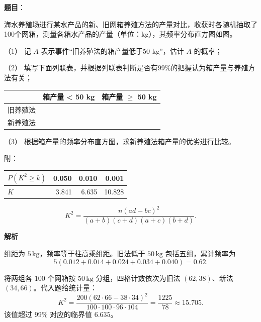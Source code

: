 \begin{answer}

\textbf{题目}：

海水养殖场进行某水产品的新、旧网箱养殖方法的产量对比，收获时各随机抽取了100个网箱，测量各箱水产品的产量（单位：kg），其频率分布直方图如图。
\nopagebreak[4]
\begin{center}\end{center}
\nopagebreak[4]
（1） 记 \(A\) 表示事件“旧养殖法的箱产量低于50 kg”，估计 \(A\) 的概率；

（2） 填写下面列联表，并根据列联表判断是否有99\%的把握认为箱产量与养殖方法有关；

\begin{center}
\begin{tabular}{lrr}
\toprule
 & 箱产量 < 50 kg & 箱产量 $\geq$ 50 kg \\
\midrule
旧养殖法 &  &  \\
新养殖法 &  &  \\
\bottomrule
\end{tabular}
\end{center}

（3） 根据箱产量的频率分布直方图，求新养殖法箱产量的优劣进行比较。

附：

\begin{center}
\begin{tabular}{lrrr}
\toprule
\(P(K^2\ge k)\) & 0.050 & 0.010 & 0.001 \\
\midrule
\(K\) & 3.841 & 6.635 & 10.828 \\
\bottomrule
\end{tabular}
\end{center}

\nopagebreak[4]
\[
K^2=\frac{n(ad-bc)^2}{(a+b)(c+d)(a+c)(b+d)}.
\]


\textbf{解析}


组距为 \(5\,\mathrm{kg}\)，频率等于柱高乘组距。旧法低于 \(50\,\mathrm{kg}\) 包括五组，累计频率为
\nopagebreak[4]
\[
5(0.012+0.014+0.024+0.034+0.040)=0.62.
\]


将两组各 \(100\) 个网箱按 \(50\,\mathrm{kg}\) 分组，四格计数依次为旧法 \((62,38)\)、新法 \((34,66)\)。代入题给统计量：
\nopagebreak[4]
\[
K^2=\frac{200(62\cdot66-38\cdot34)^2}{100\cdot100\cdot96\cdot104}=\frac{1225}{78}\approx15.705.
\]
该值超过 99\% 对应的临界值 \(6.635\)。


\end{answer}
